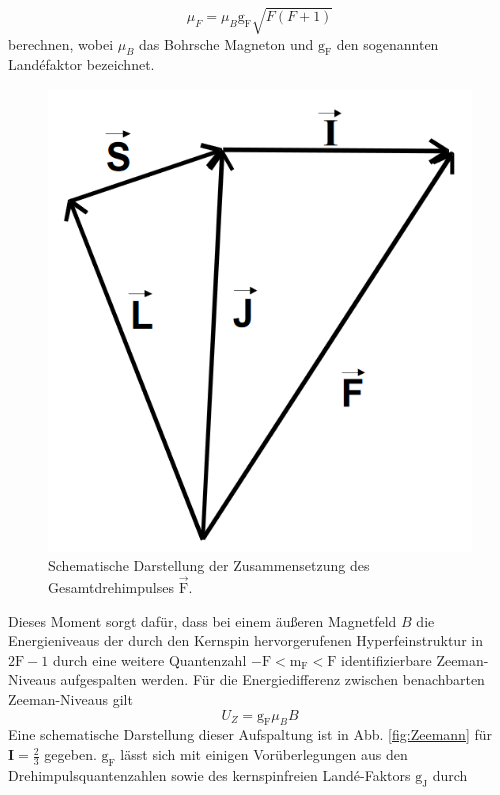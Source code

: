 \begin{equation}
  \mu_F = \mu_B \text{g}_\text{F} \sqrt{F(F+1)}
  \label{eqn:mu_F}
\end{equation}
berechnen, wobei $\mu_B$ das Bohrsche Magneton und $\text{g}_\text{F}$  den sogenannten Landéfaktor bezeichnet.
\begin{figure}
  \centering
  \includegraphics{./Kopplung.PNG}
  \caption{Schematische Darstellung der Zusammensetzung des Gesamtdrehimpulses $\vec{\text{F}}$\cite{Anleitung}.}
  \label{fig:F}
\end{figure}
Dieses Moment sorgt dafür, dass bei einem äußeren Magnetfeld $B$ die Energieniveaus der durch den Kernspin hervorgerufenen Hyperfeinstruktur in $2\text{F}-1$ durch eine weitere Quantenzahl $-\text{F}<\text{m}_\text{F}<\text{F}$ identifizierbare Zeeman-Niveaus aufgespalten werden. Für die Energiedifferenz zwischen benachbarten Zeeman-Niveaus gilt
\begin{equation}
  U_{Z}=\text{g}_\text{F}\mu_B B
  \label{eqn:U}
\end{equation}
Eine schematische Darstellung dieser Aufspaltung ist in Abb. \ref{fig:Zeemann} für $\mathbf{I}= \frac{2}{3}$ gegeben.
$\text{g}_\text{F}$ lässt sich mit einigen Vorüberlegungen aus den Drehimpulsquantenzahlen sowie des kernspinfreien Landé-Faktors $\text{g}_\text{J}$ durch
